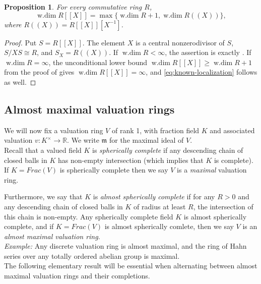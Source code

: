 \documentclass[12pt]{amsart}
\newtheorem{proposition}[theorem]{Proposition}
\theoremstyle{plain}
\newcommand{\wdim}{\operatorname{w.dim}}
\begin{document}
\begin{proposition}\label{prop:known-localization}
For every commutative ring $R$,
\begin{equation}\label{eq:known-localization}
  \wdim R[[X]]
  =\max\{\wdim R+1,\wdim R((X))\},
\end{equation}
where $R((X))=R[[X]][X^{-1}]$.
\end{proposition}

\begin{proof}
Put $S=R[[X]]$. The element $X$ is a central nonzerodivisor of $S$,
$S/XS\cong R$, and $S_X=R((X))$. If $\wdim R<\infty$, the assertion is
exactly \cite[Theorem~3.7]{RajabiTorrecillasYassemi}. If
$\wdim R=\infty$, the unconditional lower bound
$\wdim R[[X]]\geq\wdim R+1$ from the proof of
\cite[Lemma~1]{JondrupSmall} gives $\wdim R[[X]]=\infty$, and
\eqref{eq:known-localization} follows as well.
\end{proof}

\subsection{Almost maximal valuation rings}

We will now fix a valuation ring $V$ of rank 1, with fraction field $K$ and associated valuation $v:K^\times\to \mathbb{R}$. We write $\mathfrak{m}$ for the maximal ideal of $V$.\\

\noindent Recall that a valued field $K$ is \emph{spherically complete} if any descending chain of closed balls in $K$ has non-empty intersection (which implies that $K$ is complete). If $K=Frac(V)$ is spherically complete then we say $V$ is a \emph{maximal} valuation ring.

Furthermore, we say that $K$ is \emph{almost spherically complete} if for any $R>0$ and any descending chain of closed balls in $K$ of radius at least $R$, the intersection of this chain is non-empty. Any spherically complete field $K$ is almost spherically complete, and if $K=Frac(V)$ is almost spherically comlete, then we say $V$ is an \emph{almost maximal valuation ring}.\\

\noindent\emph{Example:} Any discrete valuation ring is almost maximal, and the ring of Hahn series over any totally ordered abelian group is maximal.\\

\noindent The following elementary result will be essential when alternating between almost maximal valuation rings and their completions.
\end{document}
